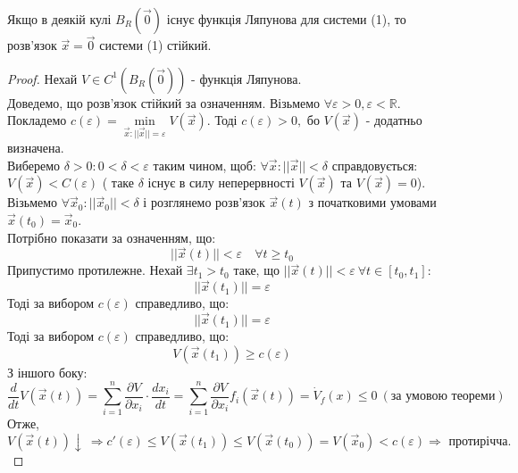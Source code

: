  \begin{boxteo}
   Якщо в деякій кулі $B_{R}( \overrightarrow{0}) $ існує функція Ляпунова для системи (1), то розв'язок $ \overrightarrow{x} = \overrightarrow{0} $ системи (1) стійкий.
 \end{boxteo}
\begin{proof}
 Нехай $ V \in C^{1} ( B_{R} ( \overrightarrow{0} ))$ - функція Ляпунова.\\
 Доведемо, що розв'язок стійкий за означенням.
 Візьмемо $ \forall \varepsilon > 0, \varepsilon < \mathbb{R}$.\\ Покладемо $ c( \varepsilon) = \min\limits_{\overrightarrow{x} : ||\overrightarrow{x}|| = \varepsilon} V(\overrightarrow{x}) $.
 Тоді $ c(\varepsilon) > 0, $ бо $ V( \overrightarrow{x}) $ - додатньо визначена.\\
 Виберемо $ \delta > 0 : 0 < \delta < \varepsilon $ таким чином, щоб: $ \forall \overrightarrow{x}: ||\overrightarrow{x}|| < \delta $ справдовується:\\
 $V (\overrightarrow{x}) < C(\varepsilon) $ ( таке $\delta$ існує в силу неперервності $V( \overrightarrow{x})$ та $V ( \overrightarrow{x}) =0 $).\\
 Візьмемо $\forall \overrightarrow{x}_0: ||\overrightarrow{x}_0||< \delta $ і розглянемо розв'язок $\overrightarrow{x} (t) $ з початковими умовами $ \overrightarrow{x}(t_0) = \overrightarrow{x}_0$.\\
 Потрібно показати за означенням, що:
 $$
 ||\overrightarrow{x}(t)|| < \varepsilon \quad \forall t \geq t_0
 $$
Припустимо протилежне. Нехай $ \exists t_1 > t_0 $ таке, що $|| \overrightarrow{x}(t) ||< \varepsilon \ \forall t \in [ t_0 , t_1 ]:  $ $$ || \overrightarrow{ x} (t_1) || = \varepsilon$$
Тоді за вибором $c(\varepsilon)$ справедливо, що:
$$
|| \overrightarrow{x} (t_1) || = \varepsilon
$$
Тоді за вибором $ c ( \varepsilon)$ справедливо, що:
$$
V(\overrightarrow{x} (t_1) ) \geq c(\varepsilon)
$$
З іншого боку:
$$
\frac{d}{dt} V(\overrightarrow{x} (t)) =  \sum\limits_{i = 1}^{ n}{ \frac{\partial V}{ \partial x_i } } \cdot \frac{dx_i}{dt} =  \sum\limits_{i = 1}^{n}{ \frac{\partial V}{ \partial x_i } f_i ( \overrightarrow{x} (t))} = \dot{V}_f (x) \leq 0 \  (\text{за умовою теореми})
$$
Отже, $V (\overrightarrow{x}(t))\!\! \downarrow \  \!\Rightarrow\!
c'(\varepsilon) \!\leq\!  V(\overrightarrow{x} (t_1)) \!\leq\! V(\overrightarrow{x} (t_0)) = V(\overrightarrow{x}_0) \!<\! c(\varepsilon ) \!\Rightarrow\! \text{ протирічча. }
$

\end{proof}
